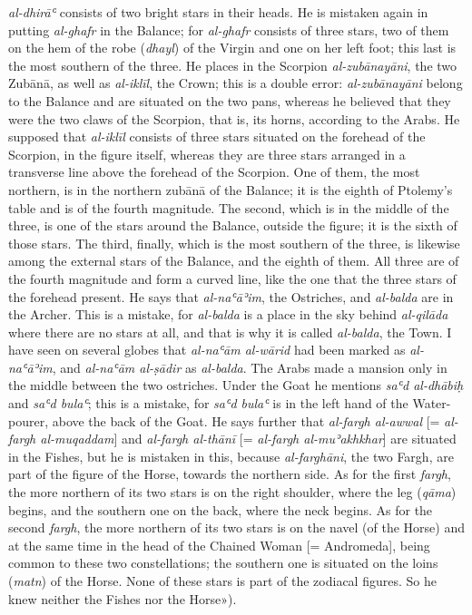 \documentclass[11pt]{article}
\begin{document}
\emph{al-dhirāʿ} consists of two bright stars in their heads. He is mistaken again in putting \emph{al-ghafr} in the Balance; for \emph{al-ghafr} consists of three stars, two of them on the hem of the robe (\emph{dhayl}) of the Virgin and one on her left foot; this last is the most southern of the three. He places in the Scorpion \emph{al-zubānayāni}, the two Zubānā, as well as \emph{al-iklīl}, the Crown; this is a double error: \emph{al-zubānayāni} belong to the Balance and are situated on the two pans, whereas he believed that they were the two claws of the Scorpion, that is, its horns, according to the Arabs. He supposed that \emph{al-iklīl} consists of three stars situated on the forehead of the Scorpion, in the figure itself, whereas they are three stars arranged in a transverse line above the forehead of the Scorpion. One of them, the most northern, is in the northern zubānā of the Balance; it is the eighth of Ptolemy's table and is of the fourth magnitude. The second, which is in the middle of the three, is one of the stars around the Balance, outside the figure; it is the sixth of those stars. The third, finally, which is the most southern of the three, is likewise among the external stars of the Balance, and the eighth of them. All three are of the fourth magnitude and form a curved line, like the one that the three stars of the forehead present. He says that \emph{al-naʿāʾim}, the Ostriches, and \emph{al-balda} are in the Archer. This is a mistake, for \emph{al-balda} is a place in the sky behind \emph{al-qilāda} where there are no stars at all, and that is why it is called \emph{al-balda}, the Town. I have seen on several globes that \emph{al-naʿām al-wārid} had been marked as \emph{al-naʿāʾim}, and \emph{al-naʿām al-ṣādir} as \emph{al-balda}. The Arabs made a mansion only in the middle between the two ostriches. Under the Goat he mentions \emph{saʿd al-dhābiḥ} and \emph{saʿd bulaʿ}; this is a mistake, for \emph{saʿd bulaʿ} is in the left hand of the Water-pourer, above the back of the Goat. He says further that \emph{al-fargh al-awwal} [= \emph{al-fargh al-muqaddam}] and \emph{al-fargh al-thānī} [= \emph{al-fargh al-muʾakhkhar}] are situated in the Fishes, but he is mistaken in this, because \emph{al-farghāni}, the two Fargh, are part of the figure of the Horse, towards the northern side. As for the first \emph{fargh}, the more northern of its two stars is on the right shoulder, where the leg (\emph{qāma}) begins, and the southern one on the back, where the neck begins. As for the second \emph{fargh}, the more northern of its two stars is on the navel (of the Horse) and at the same time in the head of the Chained Woman [= Andromeda], being common to these two constellations; the southern one is situated on the loins (\emph{matn}) of the Horse. None of these stars is part of the zodiacal figures. So he knew neither the Fishes nor the Horse»).\par
\end{document}
